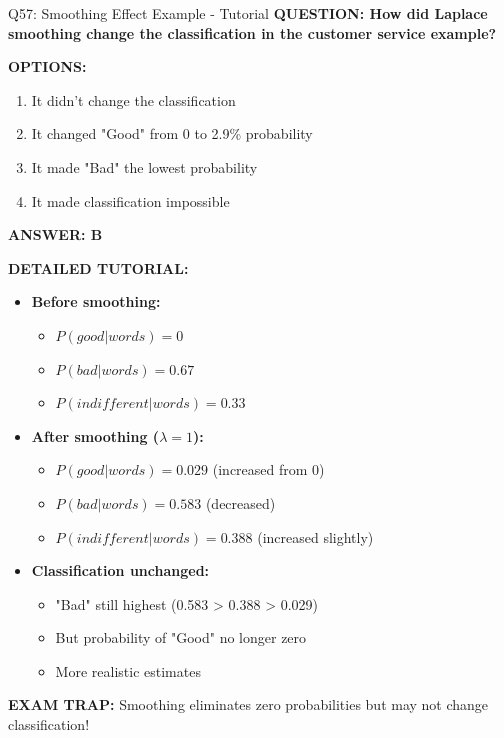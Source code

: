 \documentclass[8pt]{beamer}
\begin{document}
	\begin{frame}{Q57: Smoothing Effect Example - Tutorial}
		\fontsize{6.5}{7.5}\selectfont
		\textbf{QUESTION: How did Laplace smoothing change the classification in the customer service example?}
		
		\vspace{0.1cm}
		\textbf{OPTIONS:}
		\begin{enumerate}
			\item It didn't change the classification
			\item It changed "Good" from 0 to 2.9\% probability
			\item It made "Bad" the lowest probability
			\item It made classification impossible
		\end{enumerate}
		
		\vspace{0.1cm}
		\textcolor{myblue}{\textbf{ANSWER: B}}
		
		\vspace{0.1cm}
		\textbf{DETAILED TUTORIAL:}
		\begin{itemize}
			\item \textbf{Before smoothing:}
			\begin{itemize}
				\item $P(good|words) = 0$
				\item $P(bad|words) = 0.67$
				\item $P(indifferent|words) = 0.33$
			\end{itemize}
			\item \textbf{After smoothing ($\lambda = 1$):}
			\begin{itemize}
				\item $P(good|words) = 0.029$ (increased from 0)
				\item $P(bad|words) = 0.583$ (decreased)
				\item $P(indifferent|words) = 0.388$ (increased slightly)
			\end{itemize}
			\item \textbf{Classification unchanged:}
			\begin{itemize}
				\item "Bad" still highest (0.583 > 0.388 > 0.029)
				\item But probability of "Good" no longer zero
				\item More realistic estimates
			\end{itemize}
		\end{itemize}
		
		\textcolor{myred}{\textbf{EXAM TRAP:}} Smoothing \textcolor{myblue}{eliminates zero probabilities} but may not change classification!
	\end{frame}
	
\end{document}
